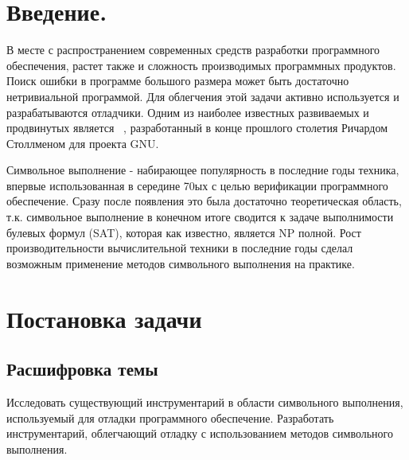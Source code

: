 

\newpage
\tableofcontents
\newpage

\bigskip
\section{Введение.}

В месте с распространением современных средств разработки программного обеспечения, растет также и сложность производимых программных продуктов. Поиск ошибки в программе большого размера может быть достаточно нетривиальной программой. Для облегчения этой задачи активно используется и разрабатываются отладчики. Одним из наиболее известных развиваемых и продвинутых является ~\cite{gdb}, разработанный в конце прошлого столетия Ричардом Столлменом для проекта GNU.

Символьное выполнение - набирающее популярность в последние годы техника, впервые использованная
в середине 70ых с целью верификации программного обеспечение. Сразу после появления это была достаточно теоретическая область, т.к. символьное выполнение в конечном итоге сводится
к задаче выполнимости булевых формул (SAT), которая как известно, является NP полной.
Рост производительности вычислительной техники в последние годы сделал возможным применение методов символьного выполнения на практике.

\section{Постановка задачи}
\subsection{Расшифровка темы}
Исследовать существующий инструментарий в области символьного выполнения, используемый для отладки программного обеспечение.
Разработать инструментарий, облегчающий отладку с использованием методов символьного выполнения.

